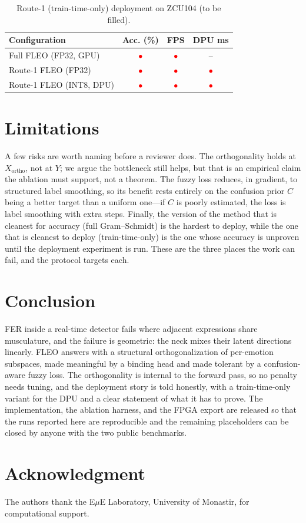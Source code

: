 \documentclass[journal]{IEEEtran}
\newcommand{\pending}{\textcolor{red}{$\bullet$}}
\begin{document}
\begin{table}[t]
\caption{Route-1 (train-time-only) deployment on ZCU104 (to be filled).}
\label{tab:deploy}
\centering
\begin{tabular}{lccc}
\toprule
Configuration & Acc. (\%) & FPS & DPU ms \\
\midrule
Full FLEO (FP32, GPU)       & \pending & \pending & -- \\
Route-1 FLEO (FP32)         & \pending & \pending & \pending \\
Route-1 FLEO (INT8, DPU)    & \pending & \pending & \pending \\
\bottomrule
\end{tabular}
\end{table}

\section{Limitations}
A few risks are worth naming before a reviewer does. The orthogonality holds
at $X_\text{ortho}$, not at $Y$; we argue the bottleneck still helps, but that
is an empirical claim the ablation must support, not a theorem. The fuzzy loss
reduces, in gradient, to structured label smoothing, so its benefit rests
entirely on the confusion prior $C$ being a better target than a uniform
one---if $C$ is poorly estimated, the loss is label smoothing with extra
steps. Finally, the version of the method that is cleanest for accuracy (full
Gram--Schmidt) is the hardest to deploy, while the one that is cleanest to
deploy (train-time-only) is the one whose accuracy is unproven until the
deployment experiment is run. These are the three places the work can fail, and
the protocol targets each.

\section{Conclusion}
FER inside a real-time detector fails where adjacent expressions share
musculature, and the failure is geometric: the neck mixes their latent
directions linearly. FLEO answers with a structural orthogonalization of
per-emotion subspaces, made meaningful by a binding head and made tolerant by
a confusion-aware fuzzy loss. The orthogonality is internal to the forward
pass, so no penalty needs tuning, and the deployment story is told honestly,
with a train-time-only variant for the DPU and a clear statement of what it has
to prove. The implementation, the ablation harness, and the FPGA export are
released so that the runs reported here are reproducible and the remaining
placeholders can be closed by anyone with the two public benchmarks.

\section*{Acknowledgment}
The authors thank the E$\mu$E Laboratory, University of Monastir, for
computational support. %



\end{document}
